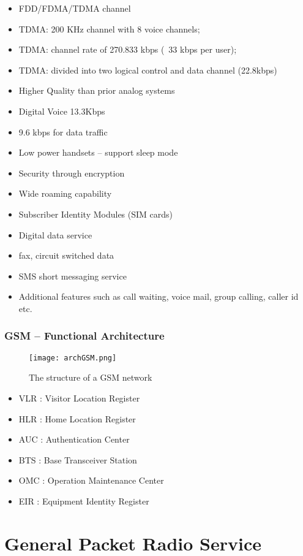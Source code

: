 \begin{itemize}
  \item FDD/FDMA/TDMA channel
  \item TDMA: 200 KHz channel with 8 voice channels;
  \item TDMA: channel rate of 270.833 kbps (~33 kbps per user);
  \item TDMA: divided into two logical control and data channel (22.8kbps)
  \item Higher Quality than prior analog systems
  \item Digital Voice 13.3Kbps
  \item 9.6 kbps for data traffic
  \item Low power handsets – support sleep mode
  \item Security through encryption
  \item Wide roaming capability
  \item Subscriber Identity Modules (SIM cards)
  \item Digital data service
  \item fax, circuit switched data
  \item SMS short messaging service
  \item Additional features such as call waiting, voice mail, group calling,
caller id etc.
\end{itemize}

\subsubsection{GSM – Functional Architecture}

\begin{figure}[H]
  \centering
  \texttt{[image: archGSM.png]}
  \caption{The structure of a GSM network}
  \label{fig:archGSM}
\end{figure}

\begin{itemize}
  \item VLR : Visitor Location Register
  \item HLR : Home Location Register
  \item AUC : Authentication Center
  \item BTS : Base Transceiver Station
  \item OMC : Operation Maintenance Center
  \item EIR : Equipment Identity Register
\end{itemize}

\section{General Packet Radio Service}


